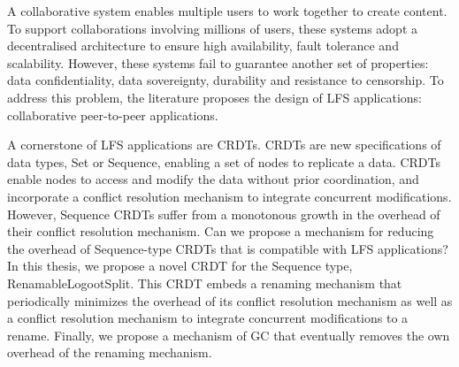 \begin{ThesisAbstract}
\begin{FrenchAbstract}
    \end{FrenchAbstract}
    \begin{EnglishAbstract}
        A collaborative system enables multiple users to work together to create content.
        To support collaborations involving millions of users, these systems adopt a decentralised architecture to ensure high availability, fault tolerance and scalability.
        However, these systems fail to guarantee another set of properties: data confidentiality, data sovereignty, durability and resistance to censorship.
        To address this problem, the literature proposes the design of \acf{LFS} applications: collaborative peer-to-peer applications.

        A cornerstone of LFS applications are \acfp{CRDT}.
        \acp{CRDT} are new specifications of data types, \eg Set or Sequence, enabling a set of nodes to replicate a data.
        \acp{CRDT} enable nodes to access and modify the data without prior coordination, and incorporate a conflict resolution mechanism to integrate concurrent modifications.
        However, Sequence \acp{CRDT} suffer from a monotonous growth in the overhead of their conflict resolution mechanism.
        Can we propose a mechanism for reducing the overhead of Sequence-type CRDTs that is compatible with LFS applications?
        In this thesis, we propose a novel \ac{CRDT} for the Sequence type, RenamableLogootSplit.
        This \ac{CRDT} embeds a renaming mechanism that periodically minimizes the overhead of its conflict resolution mechanism as well as a conflict resolution mechanism to integrate concurrent modifications to a rename.
        Finally, we propose a mechanism of \acf{GC} that eventually removes the own overhead of the renaming mechanism.
    \end{EnglishAbstract}
\end{ThesisAbstract}
